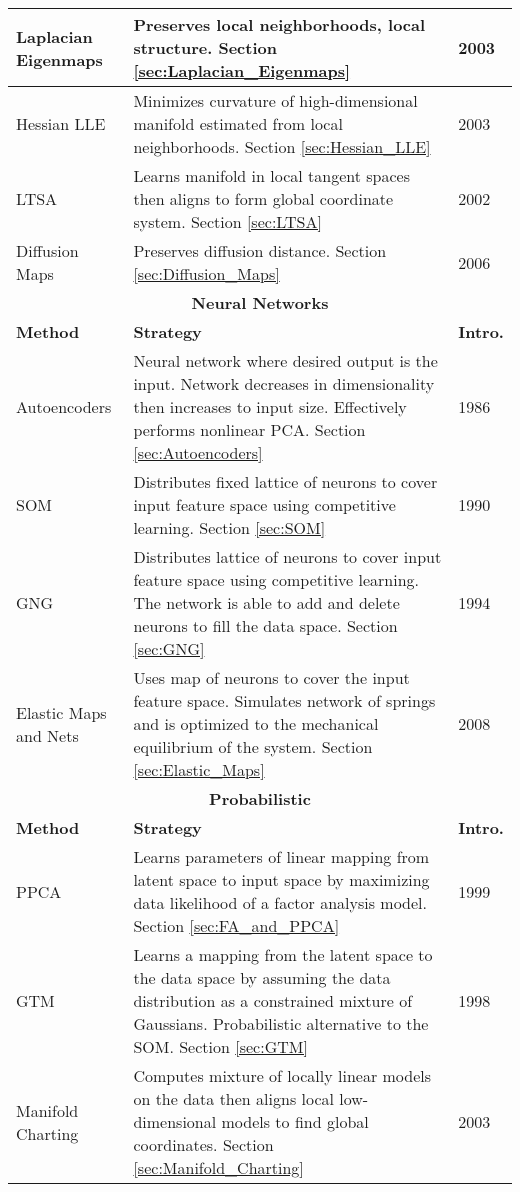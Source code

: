 \begin{longtable}{ |p{}|p{}|p{}| }
	\hline
	Laplacian Eigenmaps  & Preserves local neighborhoods, local structure.  Section \ref{sec:Laplacian_Eigenmaps}  & 2003 \\
	\hline
	Hessian LLE  & Minimizes curvature of high-dimensional manifold estimated from local neighborhoods. Section \ref{sec:Hessian_LLE} & 2003 \\
	\hline
	LTSA  &  Learns manifold in local tangent spaces then aligns to form global coordinate system.  Section \ref{sec:LTSA} & 2002\\
	\hline
	Diffusion Maps  & Preserves diffusion distance.  Section \ref{sec:Diffusion_Maps}  & 2006\\
	\hline
	\multicolumn{3}{|c|}{\textbf{Neural Networks}} \\
	\hline
	\textbf{Method} & \textbf{Strategy} & \textbf{Intro.}\\
	\hline
	Autoencoders  & Neural network where desired output is the input.  Network decreases in dimensionality then increases to input size.  Effectively performs nonlinear PCA. Section \ref{sec:Autoencoders}  & 1986 \\
	\hline
	SOM  & Distributes fixed lattice of neurons to cover input feature space using competitive learning. Section \ref{sec:SOM}   & 1990\\
	\hline
	GNG  & Distributes lattice of neurons to cover input feature space using competitive learning. The network is able to add and delete neurons to fill the data space. Section \ref{sec:GNG}& 1994\\
	\hline
	Elastic Maps and Nets  &  Uses map of neurons to cover the input feature space. Simulates network of springs and is optimized to the mechanical equilibrium of the system.  Section \ref{sec:Elastic_Maps}  & 2008 \\
	\hline
	\multicolumn{3}{|c|}{\textbf{Probabilistic}}\\
	\hline
	\textbf{Method} & \textbf{Strategy} & \textbf{Intro.}\\
	\hline
	PPCA  & Learns parameters of linear mapping from latent space to input space by maximizing data likelihood of a factor analysis model.  Section \ref{sec:FA_and_PPCA} & 1999\\
	\hline
	GTM  &  Learns a mapping from the latent space to the data space by assuming the data distribution as a constrained mixture of Gaussians.  Probabilistic alternative to the SOM. Section \ref{sec:GTM} & 1998\\
	\hline
	Manifold Charting  & Computes mixture of locally linear models on the data then aligns local low-dimensional models to find global coordinates. Section \ref{sec:Manifold_Charting} & 2003 \\

\end{longtable}
